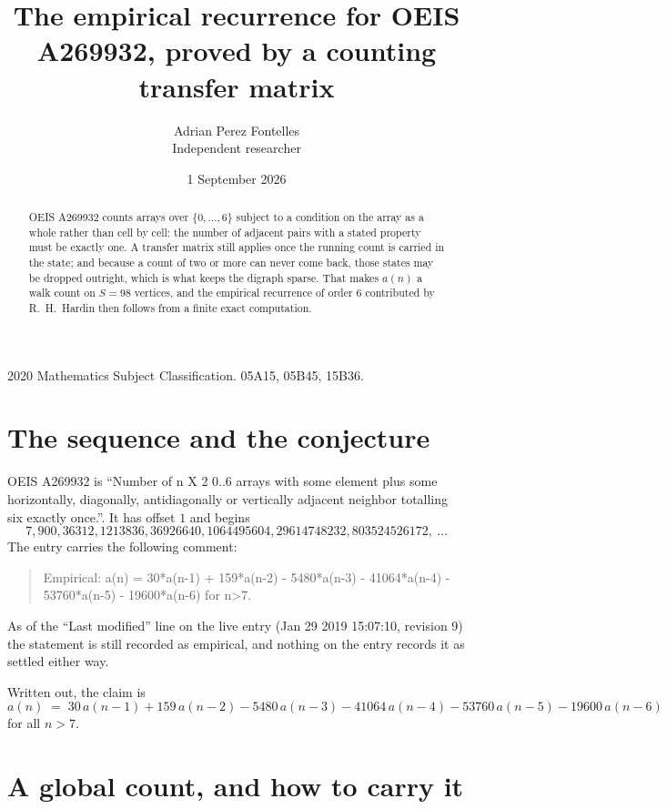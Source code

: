 \documentclass[11pt,a4paper]{article}
\title{The empirical recurrence for OEIS A269932, proved by a counting transfer matrix}
\author{Adrian Perez Fontelles\\ \small Independent researcher}
\date{1 September 2026}
\theoremstyle{plain}
\theoremstyle{definition}
\begin{document}
\maketitle

\begin{abstract}
OEIS A269932 counts arrays over $\{0,\dots,6\}$ subject to a condition on the array as a
whole rather than cell by cell: the number of adjacent pairs with a stated property must be
exactly one. A transfer matrix still applies once the running count is carried in the state; and
because a count of two or more can never come back, those states may be dropped outright,
which is what keeps the digraph sparse. That makes $a(n)$ a walk count on $S=98$ vertices,
and the empirical recurrence of order $6$ contributed by R.~H.~Hardin then follows from
a finite exact computation.
\end{abstract}

\noindent\small 2020 Mathematics Subject Classification. 05A15, 05B45, 15B36.\normalsize

\section{The sequence and the conjecture}

OEIS A269932 is ``Number of n X 2 0..6 arrays with some element plus some horizontally, diagonally, antidiagonally or vertically adjacent neighbor totalling six exactly once.''. It has offset $1$ and begins
\[
7, 900, 36312, 1213836, 36926640, 1064495604, 29614748232, 803524526172,\ \dots
\]
The entry carries the following comment:
\begin{quote}\small
Empirical: a(n) = 30*a(n-1) + 159*a(n-2) - 5480*a(n-3) - 41064*a(n-4) - 53760*a(n-5) - 19600*a(n-6) for n>7.
\end{quote}
As of the ``Last modified'' line on the live entry (Jan 29 2019 15:07:10, revision 9) the statement is
still recorded as empirical, and nothing on the entry records it as settled either way.

Written out, the claim is
\begin{equation}\label{eq:conj}
a(n)\;=\;30\,a(n-1) + 159\,a(n-2) - 5480\,a(n-3) - 41064\,a(n-4) - 53760\,a(n-5) - 19600\,a(n-6)
\end{equation}
for all $n>7$.

\section{A global count, and how to carry it}
\end{document}
